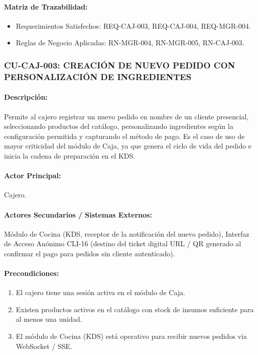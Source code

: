 \paragraph{Matriz de Trazabilidad:}
\begin{itemize}
    \item Requerimientos Satisfechos: REQ-CAJ-003, REQ-CAJ-004, REQ-MGR-004.
    \item Reglas de Negocio Aplicadas: RN-MGR-004, RN-MGR-005, RN-CAJ-003.
\end{itemize}

\subsubsection{CU-CAJ-003: CREACIÓN DE NUEVO PEDIDO CON PERSONALIZACIÓN DE INGREDIENTES}
\paragraph{Descripción:} Permite al cajero registrar un nuevo pedido en nombre de un cliente presencial, seleccionando productos del catálogo, personalizando ingredientes según la configuración permitida y capturando el método de pago. Es el caso de uso de mayor criticidad del módulo de Caja, ya que genera el ciclo de vida del pedido e inicia la cadena de preparación en el KDS.

\paragraph{Actor Principal:} Cajero.

\paragraph{Actores Secundarios / Sistemas Externos:} Módulo de Cocina (KDS, receptor de la notificación del nuevo pedido), Interfaz de Acceso Anónimo CLI-16 (destino del ticket digital URL / QR generado al confirmar el pago para pedidos sin cliente autenticado).

\paragraph{Precondiciones:}
\begin{enumerate}
    \item[I.] El cajero tiene una sesión activa en el módulo de Caja.
    \item[II.] Existen productos activos en el catálogo con stock de insumos suficiente para al menos una unidad.
    \item[III.] El módulo de Cocina (KDS) está operativo para recibir nuevos pedidos vía WebSocket / SSE.
\end{enumerate}

